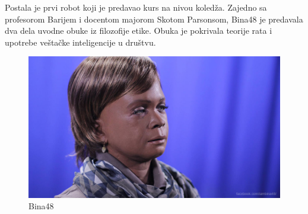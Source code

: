 \documentclass[a4paper]{article}
\begin{document}
Postala je prvi robot koji je predavao kurs na nivou koledža. Zajedno sa profesorom Barijem i docentom majorom Skotom Parsonsom, Bina48 je predavala dva dela uvodne obuke iz filozofije etike. Obuka je pokrivala teorije rata i upotrebe veštačke inteligencije u društvu. 
 
\begin{figure}[ht!]
\begin{center}
\includegraphics[scale=0.3]{Bina48.jpg}
\end{center}
\caption{Bina48}
\label{fig:bina48}
\end{figure}
\end{document}

